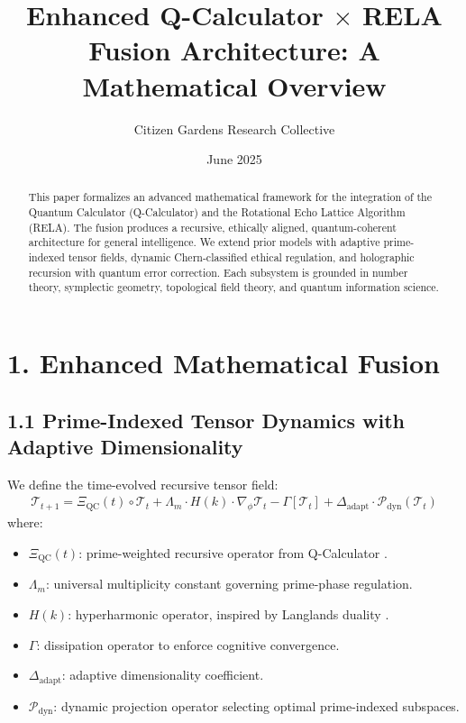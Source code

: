 \documentclass[12pt]{article}
\title{Enhanced Q-Calculator \texorpdfstring{$\times$}{x} RELA Fusion Architecture: A Mathematical Overview}
\author{Citizen Gardens Research Collective}
\date{June 2025}
\begin{document}
\maketitle

\begin{abstract}
This paper formalizes an advanced mathematical framework for the integration of the Quantum Calculator (Q-Calculator) and the Rotational Echo Lattice Algorithm (RELA). The fusion produces a recursive, ethically aligned, quantum-coherent architecture for general intelligence. We extend prior models with adaptive prime-indexed tensor fields, dynamic Chern-classified ethical regulation, and holographic recursion with quantum error correction. Each subsystem is grounded in number theory, symplectic geometry, topological field theory, and quantum information science.
\end{abstract}

\section*{1. Enhanced Mathematical Fusion}
\subsection*{1.1 Prime-Indexed Tensor Dynamics with Adaptive Dimensionality}
We define the time-evolved recursive tensor field:
\begin{align}
\mathcal{T}_{t+1} = \Xi_{\text{QC}}(t) \circ \mathcal{T}_t + \Lambda_m \cdot H(k) \cdot \nabla_\phi \mathcal{T}_t - \Gamma[\mathcal{T}_t] + \Delta_{\text{adapt}} \cdot \mathcal{P}_{\text{dyn}}(\mathcal{T}_t)
\end{align}
where:
\begin{itemize}
  \item $\Xi_{\text{QC}}(t)$: prime-weighted recursive operator from Q-Calculator \cite{preskill2018quantum}.
  \item $\Lambda_m$: universal multiplicity constant governing prime-phase regulation.
  \item $H(k)$: hyperharmonic operator, inspired by Langlands duality \cite{deligne2002modular}.
  \item $\Gamma$: dissipation operator to enforce cognitive convergence.
  \item $\Delta_{\text{adapt}}$: adaptive dimensionality coefficient.
  \item $\mathcal{P}_{\text{dyn}}$: dynamic projection operator selecting optimal prime-indexed subspaces.
\end{itemize}
\end{document}
